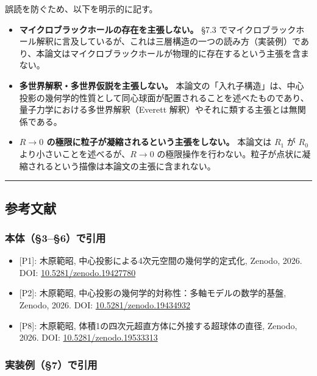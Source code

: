 \documentclass[
  a4paper,11pt]{ltjsarticle}
\providecommand{\tightlist}{%
  \setlength{\itemsep}{0pt}\setlength{\parskip}{0pt}}
\begin{document}
誤読を防ぐため、以下を明示的に記す。

\begin{itemize}
\tightlist
\item
  \textbf{マイクロブラックホールの存在を主張しない。} §7.3
  でマイクロブラックホール解釈に言及しているが、これは三層構造の一つの読み方（実装例）であり、本論文はマイクロブラックホールが物理的に存在するという主張を含まない。
\item
  \textbf{多世界解釈・多世界仮説を主張しない。}
  本論文の「入れ子構造」は、中心投影の幾何学的性質として同心球面が配置されることを述べたものであり、量子力学における多世界解釈（Everett
  解釈）やそれに類する主張とは無関係である。
\item
  \textbf{\(R \to 0\) の極限に粒子が凝縮されるという主張をしない。}
  本論文は \(R_1\) が \(R_0\) より小さいことを述べるが、\(R \to 0\)
  の極限操作を行わない。粒子が点状に凝縮されるという描像は本論文の主張に含まれない。
\end{itemize}

\begin{center}\rule{0.5\linewidth}{0.5pt}\end{center}

\subsection{参考文献}\label{ux53c2ux8003ux6587ux732e}

\subsubsection{本体（§3--§6）で引用}\label{ux672cux4f5336ux3067ux5f15ux7528}

\begin{itemize}
\tightlist
\item
  {[}P1{]}: 木原範昭, 中心投影による4次元空間の幾何学的定式化, Zenodo,
  2026. DOI:
  \href{https://doi.org/10.5281/zenodo.19427780}{10.5281/zenodo.19427780}
\item
  {[}P2{]}: 木原範昭, 中心投影の幾何学的対称性：多軸モデルの数学的基盤,
  Zenodo, 2026. DOI:
  \href{https://doi.org/10.5281/zenodo.19434932}{10.5281/zenodo.19434932}
\item
  {[}P8{]}: 木原範昭, 体積1の四次元超直方体に外接する超球体の直径,
  Zenodo, 2026. DOI:
  \href{https://doi.org/10.5281/zenodo.19533313}{10.5281/zenodo.19533313}
\end{itemize}

\subsubsection{実装例（§7）で引用}\label{ux5b9fux88c5ux4f8b7ux3067ux5f15ux7528}
\end{document}
